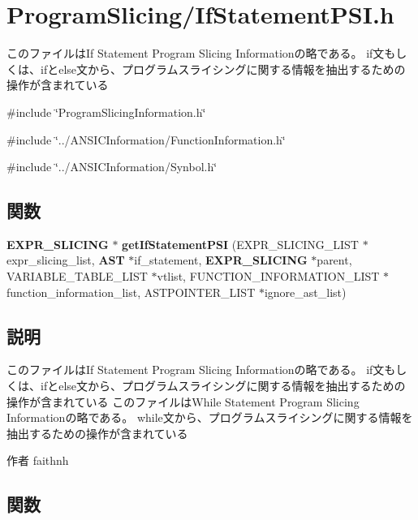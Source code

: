 \section{ProgramSlicing/IfStatementPSI.h}
\label{_if_statement_p_s_i_8h}


このファイルはIf Statement Program Slicing Informationの略である。 if文もしくは、ifとelse文から、プログラムスライシングに関する情報を抽出するための操作が含まれている  


{\ttfamily \#include \char`\"{}ProgramSlicingInformation.h\char`\"{}}\par
{\ttfamily \#include \char`\"{}../ANSICInformation/FunctionInformation.h\char`\"{}}\par
{\ttfamily \#include \char`\"{}../ANSICInformation/Synbol.h\char`\"{}}\par
\subsection*{関数}
\begin{DoxyCompactItemize}
\item 
{\bf EXPR\_\-SLICING} $\ast$ {\bf getIfStatementPSI} (EXPR\_\-SLICING\_\-LIST $\ast$expr\_\-slicing\_\-list, {\bf AST} $\ast$if\_\-statement, {\bf EXPR\_\-SLICING} $\ast$parent, VARIABLE\_\-TABLE\_\-LIST $\ast$vtlist, FUNCTION\_\-INFORMATION\_\-LIST $\ast$function\_\-information\_\-list, ASTPOINTER\_\-LIST $\ast$ignore\_\-ast\_\-list)
\end{DoxyCompactItemize}


\subsection{説明}
このファイルはIf Statement Program Slicing Informationの略である。 if文もしくは、ifとelse文から、プログラムスライシングに関する情報を抽出するための操作が含まれている このファイルはWhile Statement Program Slicing Informationの略である。 while文から、プログラムスライシングに関する情報を抽出するための操作が含まれている

\begin{DoxyAuthor}{作者}
faithnh 
\end{DoxyAuthor}


\subsection{関数}
